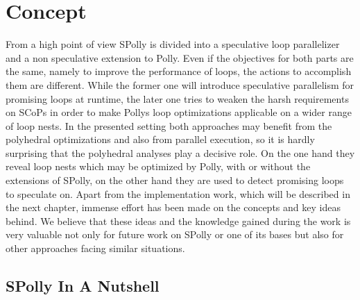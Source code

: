 
\chapter{Concept} %
\label{Chapter3}

From a high point of view SPolly is divided into a speculative loop parallelizer 
and a non speculative extension to Polly. Even if the objectives for both parts 
are the same, namely to improve the performance of loops, the actions to accomplish 
them are different. While the former one will introduce speculative parallelism
for promising loops at runtime, the later one tries to weaken the harsh 
requirements on SCoPs in order to make Pollys loop optimizations applicable on
a wider range of loop nests. In the presented setting both approaches may benefit
from the polyhedral optimizations and also from parallel execution, so it is 
hardly surprising that the polyhedral analyses play a decisive role. 
On the one hand they reveal loop nests which may be optimized by Polly, with or
without the extensions of SPolly, on the other hand they are used to detect 
promising loops to speculate on.
Apart from the implementation work, which will be described in the 
next chapter, immense effort has been made on the concepts and key ideas behind.
We believe that these ideas and the knowledge gained during the work is very 
valuable not only for future work on SPolly or one of its bases but also for
other approaches facing similar situations.


\section{SPolly In A Nutshell}

